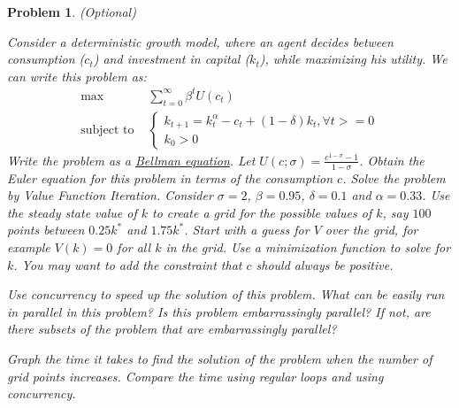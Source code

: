 \documentclass[12pt, a4paper]{article}
\newtheorem{problem}{Problem}
\begin{document}
\begin{problem}
(Optional)

Consider a deterministic growth model, where an agent decides between consumption (\(c_t\)) and investment in capital (\(k_t\)), while maximizing his utility.
We can write this problem as:
\begin{align*}
  \max&\sum_{t=0}^{\infty}\beta^tU(c_t)\\
  \text{subject to }&
                      \begin{cases}
                        k_{t+1} = k_t^{\alpha} - c_t + (1-\delta)k_t, \forall t >= 0\\
                        k_0 > 0
                      \end{cases}
\end{align*}
Write the problem as a \href{https://en.wikipedia.org/wiki/Bellman\_equation}{Bellman equation}.
Let \(U(c; \sigma)=\frac{c^{1-\sigma}-1}{1-\sigma}\).
Obtain the Euler equation for this problem in terms of the consumption \(c\).
Solve the problem by Value Function Iteration.
Consider \(\sigma=2\), \(\beta=0.95\), \(\delta=0.1\) and \(\alpha=0.33\).
Use the steady state value of \(k\) to create a grid for the possible values of \(k\), say \(100\) points between \(0.25 k^*\) and \(1.75 k^*\).
Start with a guess for \(V\) over the grid, for example \(V(k)=0\) for all \(k\) in the grid.
Use a minimization function to solve for \(k\).
You may want to add the constraint that \(c\) should always be positive.

Use concurrency to speed up the solution of this problem.
What can be easily run in parallel in this problem?
Is this problem embarrassingly parallel?
If not, are there subsets of the problem that are embarrassingly parallel?

Graph the time it takes to find the solution of the problem when the number of grid points increases.
Compare the time using regular loops and using concurrency.
\end{problem}
\end{document}
